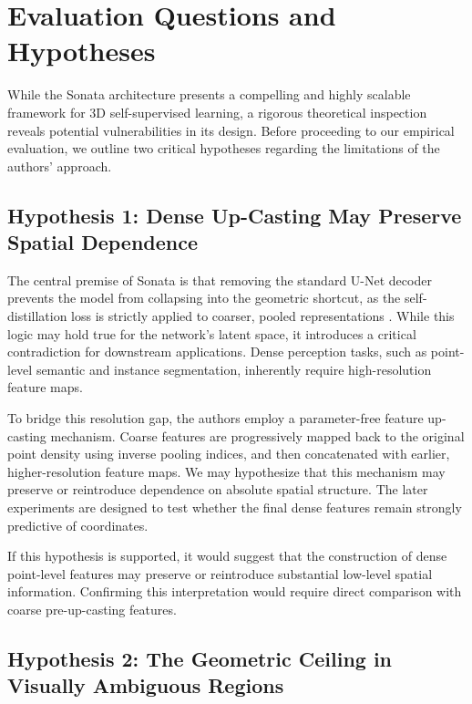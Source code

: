 \documentclass[11pt, a4paper]{article}
\begin{document}
\section{Evaluation Questions and Hypotheses}

While the Sonata architecture presents a compelling and highly scalable framework for 3D self-supervised learning, a rigorous theoretical inspection reveals potential vulnerabilities in its design. Before proceeding to our empirical evaluation, we outline two critical hypotheses regarding the limitations of the authors' approach.

\subsection{Hypothesis 1: Dense Up-Casting May Preserve Spatial Dependence}

The central premise of Sonata is that removing the standard U-Net decoder prevents the model from collapsing into the geometric shortcut, as the self-distillation loss is strictly applied to coarser, pooled representations \cite{sonata2025}. While this logic may hold true for the network's latent space, it introduces a critical contradiction for downstream applications. Dense perception tasks, such as point-level semantic and instance segmentation, inherently require high-resolution feature maps. 

To bridge this resolution gap, the authors employ a parameter-free feature up-casting mechanism. Coarse features are progressively mapped back to the original point density using inverse pooling indices, and then concatenated with earlier, higher-resolution feature maps. We may hypothesize that this mechanism may preserve or reintroduce dependence on absolute spatial structure. The later experiments are designed to test whether the final dense features remain strongly predictive of coordinates. 

If this hypothesis is supported, it would suggest that the construction of dense point-level features may preserve or reintroduce substantial low-level spatial information. Confirming this interpretation would require direct comparison with coarse pre-up-casting features.

\subsection{Hypothesis 2: The Geometric Ceiling in Visually Ambiguous Regions}
\end{document}
